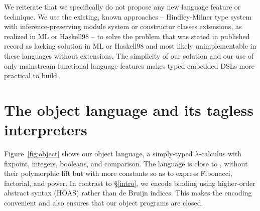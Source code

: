 We reiterate that we specifically do not propose any new language
feature or technique. We use the existing, known approaches --
Hindley-Milner type system with inference-preserving module system or
constructor classes extensions, as realized in ML or Haskell98 -- to
solve the problem that was stated in published record as lacking
solution in ML or Haskell98 and most likely unimplementable in these
languages without extensions. The simplicity of our solution and our
use of only mainstream functional language features makes typed
embedded DSLs more practical to build.
\begin{comment}
We may claim some contribution about type-preserving CPS. Check
related work section in \cite{Guillemette-Monier-PLPV}, especially
check the work of Shao on type-preserving CPS in Flint. The PLPV paper
in related work shows other tasks, including closure conversion, which
we may tackle in our approach. We may be able to write a
type-preserving, assured compiler, whose properties and assured by HM.
\end{comment}


\section{The object language and its tagless interpreters}\label{language}

Figure~\ref{fig:object} shows our object language, a simply-typed
$\lambda$-calculus with fixpoint, integers, booleans, and comparison.
The language is close to , without their polymorphic
lift but with more constants so as to express Fibonacci, factorial, and
power.
In contrast to \S\ref{intro}, we encode binding using higher-order
abstract syntax (HOAS) \cite{miller-manipulating,pfenning-higher-order}
rather than de Bruijn indices. This makes the encoding convenient and
also ensures that our object programs are closed.

